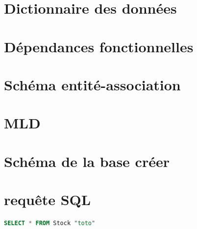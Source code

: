 \documentclass[french]{article}
\begin{document}
\begin{titlepage}
\vfill

\end{titlepage}

\newpage

\tableofcontents

\newpage

\section{Dictionnaire des données}


\section{Dépendances fonctionnelles}


\section{Schéma entité-association}

    
\section{MLD}


\section{Schéma de la base créer}

\section{requête SQL}

\begin{lstlisting}[language=sql]
SELECT * FROM Stock "toto"
\end{lstlisting}
\end{document}
